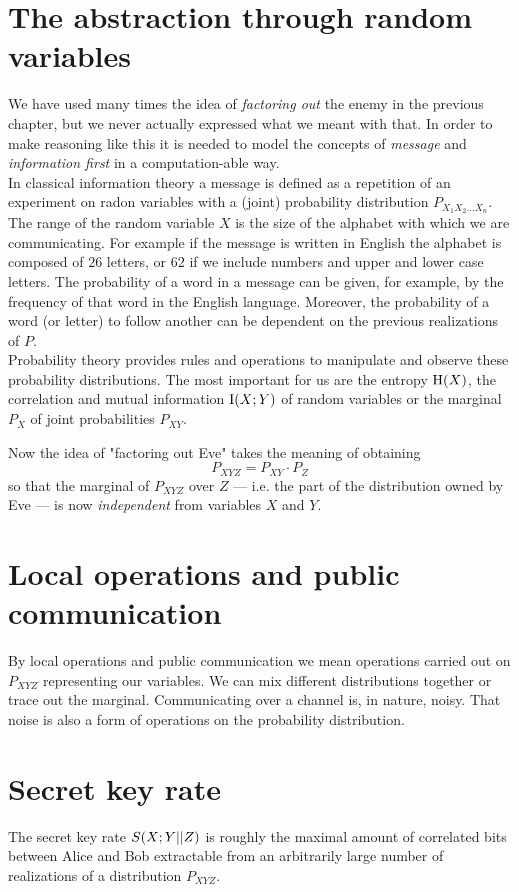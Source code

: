 \section{The abstraction through random variables}
    We have used many times the idea of \textit{factoring out} the enemy in the previous chapter, but we never actually expressed what we meant with that.
    In order to make reasoning like this it is needed to model the concepts of \textit{message} and \textit{information first} in a computation-able way.\\
    In classical information theory a message is defined as a repetition of an experiment on radon variables with a (joint) probability distribution $P_{X_1X_2\ldots X_n}$.
    The range of the random variable $X$ is the size of the alphabet with which we are communicating.
    For example if the message is written in English the alphabet is composed of $26$ letters, or $62$ if we include numbers and upper and lower case letters.
    The probability of a word in a message can be given, for example, by the frequency of that word in the English language.
    Moreover, the probability of a word (or letter) to follow another can be dependent on the previous realizations of $P$.\\
    Probability theory provides rules and operations to manipulate and observe these probability distributions.
    The most important for us are the entropy $\operatorname{H} (X)$, the correlation and mutual information $\operatorname{I}(X;Y)$ of random variables or the marginal $P_X$ of joint probabilities $P_{XY}$.
    
    Now the idea of "factoring out Eve" takes the meaning of obtaining 
    $$P_{XYZ} = P_{XY}\cdot P_Z$$
    so that the marginal of $P_{XYZ}$ over $Z$ --- i.e. the part of the distribution owned by Eve --- is now \emph{independent} from variables $X$ and $Y$.
    
\section{Local operations and public communication}
    By local operations and public communication we mean operations carried out on $P_{XYZ}$ representing our variables.
    We can mix different distributions together or trace out the marginal.
    Communicating over a channel is, in nature, noisy. 
    That noise is also a form of operations on the probability distribution.
    
\section{Secret key rate} \label{seckeyrate}
    The secret key rate $S(X;Y||Z)$ is roughly the maximal amount of correlated bits between Alice and Bob extractable from an arbitrarily large number of realizations of a distribution $P_{XYZ}$.
